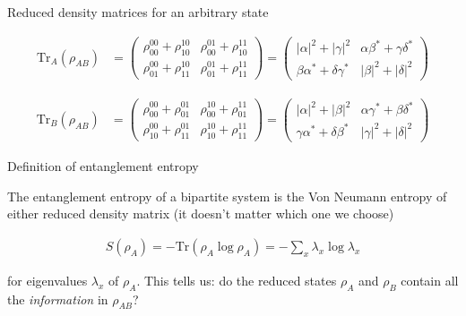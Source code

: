 \documentclass[aspectratio=1610]{beamer}					%
\begin{document}
\begin{frame}{Reduced density matrices for an arbitrary state}

\begin{align*}
\mathrm{Tr}_{A}(\rho_{AB}) &=
\begin{pmatrix}
\rho_{00}^{00}+\rho_{10}^{10} & \rho_{00}^{01}+\rho_{10}^{11}\\
\rho_{01}^{00}+\rho_{11}^{10} & \rho_{01}^{01}+\rho_{11}^{11}
\end{pmatrix}
= \begin{pmatrix}
|\alpha|^{2} + |\gamma|^{2} & \alpha\beta^{*} + \gamma\delta^{*}\\
\beta\alpha^{*} + \delta\gamma^{*} & |\beta|^{2} + |\delta|^{2}
\end{pmatrix}
\end{align*}

\begin{align*}
\mathrm{Tr}_{B}(\rho_{AB}) &=
\begin{pmatrix}
\rho_{00}^{00}+\rho_{01}^{01} & \rho_{00}^{10}+\rho_{01}^{11}\\
\rho_{10}^{00}+\rho_{11}^{01} & \rho_{10}^{10}+\rho_{11}^{11}
\end{pmatrix}
= \begin{pmatrix}
|\alpha|^{2} + |\beta|^{2} & \alpha\gamma^{*} + \beta\delta^{*}\\
\gamma\alpha^{*} + \delta\beta^{*} & |\gamma|^{2} + |\delta|^{2}
\end{pmatrix}
\end{align*}

\end{frame}

\begin{frame}{Definition of entanglement entropy}

The entanglement entropy of a bipartite system is the Von Neumann entropy of either reduced density matrix (it doesn't matter which one we choose)

\begin{align*}
S(\rho_{A}) = -\mathrm{Tr}(\rho_{A}\log\rho_{A}) = -\sum_{x}\lambda_{x}\log\lambda_{x}
\end{align*}

for eigenvalues $\lambda_{x}$ of $\rho_{A}$. This tells us: do the reduced states $\rho_{A}$ and $\rho_{B}$ contain all the \emph{information} in $\rho_{AB}$?

\end{frame}
\end{document}
